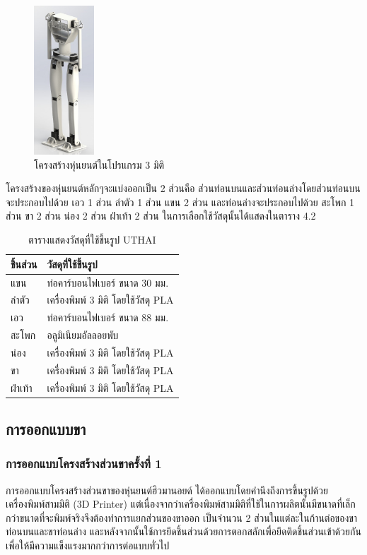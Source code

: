 \begin{figure}[!ht]
    \centering
    \includegraphics[width=0.2\textwidth]{chapter4/images/UTHAI_ver_1.jpg}
    \caption{โครงสร้างหุ่นยนต์ในโปรแกรม 3 มิติ}
    \label{fig:UTHAI_ver_1}
\end{figure}

โครงสร้างของหุ่นยนต์หลักๆจะแบ่งออกเป็น 2 ส่วนคือ ส่วนท่อนบนและส่วนท่อนล่างโดยส่วนท่อนบนจะประกอบไปด้วย 
เอว 1 ส่วน ลำตัว 1 ส่วน แขน 2 ส่วน และท่อนล่างจะประกอบไปด้วย สะโพก 1 ส่วน ขา 2 ส่วน น่อง 2 ส่วน ฝ่าเท้า 2 ส่วน 
ในการเลือกใช้วัสดุนั้นได้แสดงในตาราง 4.2

\begin{table}[ht]
	\centering
	\begin{tabular}{| l | l |}
		\hline
		ชิ้นส่วน & วัสดุที่ใช้ขึ้นรูป \\
        \hline
        แขน	& ท่อคาร์บอนไฟเบอร์ ขนาด 30 มม. \\
        ลำตัว & เครื่องพิมพ์ 3 มิติ โดยใช้วัสดุ PLA \\
        เอว	& ท่อคาร์บอนไฟเบอร์ ขนาด 88 มม. \\
        สะโพก & อลูมิเนียมอัลลอยพับ \\
        น่อง & เครื่องพิมพ์ 3 มิติ โดยใช้วัสดุ PLA \\
        ขา & เครื่องพิมพ์ 3 มิติ โดยใช้วัสดุ PLA \\
        ฝ่าเท้า	& เครื่องพิมพ์ 3 มิติ โดยใช้วัสดุ PLA \\
	    \hline
	\end{tabular}
	\caption{ตารางแสดงวัสดุที่ใช้ขึ้นรูป UTHAI}
	\label{tab:UTHAI_material}
\end{table}

\clearpage
\subsection{การออกแบบขา}
\subsubsection{การออกแบบโครงสร้างส่วนขาครั้งที่ 1}
การออกแบบโครงสร้างส่วนขาของหุ่นยนต์ฮิวมานอยด์ ได้ออกแบบโดยคำนึงถึงการขึ้นรูปด้วยเครื่องพิมพ์สามมิติ (3D Printer) 
แต่เนื่องจากว่าเครื่องพิมพ์สามมิติที่ใช้ในการผลิตนั้นมีขนาดที่เล็กกว่าขนาดที่จะพิมพ์จริงจึงต้องทำการแยกส่วนของขาออก
เป็นจำนวน 2 ส่วนในแต่ละในก้านต่อของขาท่อนบนและขาท่อนล่าง และหลังจากนั้นใช้การยึดชิ้นส่วนด้วยการตอกสลักเพื่อยึดติดชิ้นส่วนเข้าด้วยกัน
เพื่อให้มีความแข็งแรงมากกว่าการต่อแบบทั่วไป

